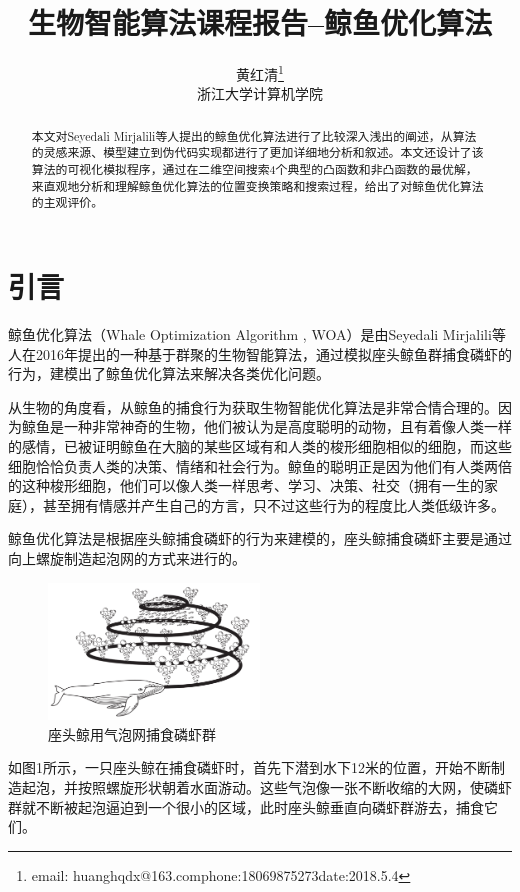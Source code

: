 \documentclass[12pt,a4paper]{article}
\author{黄红清\footnote{email: huanghqdx@163.com\quad phone:18069875273\quad date:2018.5.4}\quad21721214\\[2ex] 浙江大学计算机学院\\[2ex]}
\title{生物智能算法课程报告--鲸鱼优化算法}
\date{}
\begin{document}
\makeatletter
\let\@afterindentfalse\@afterindenttrue
\@afterindenttrue
\makeatother
\setlength{\parindent}{2em}  %
\maketitle

\begin{abstract}
\renewcommand{\abstractname}{摘要}
本文对Seyedali Mirjalili等人提出的鲸鱼优化算法进行了比较深入浅出的阐述，从算法的灵感来源、模型建立到伪代码实现都进行了更加详细地分析和叙述。本文还设计了该算法的可视化模拟程序，通过在二维空间搜索4个典型的凸函数和非凸函数的最优解，来直观地分析和理解鲸鱼优化算法的位置变换策略和搜索过程，给出了对鲸鱼优化算法的主观评价。
\end{abstract}

\section{引言}
鲸鱼优化算法（Whale Optimization Algorithm , WOA）是由Seyedali Mirjalili等人在2016年提出的一种基于群聚的生物智能算法，通过模拟座头鲸鱼群捕食磷虾的行为，建模出了鲸鱼优化算法来解决各类优化问题。

从生物的角度看，从鲸鱼的捕食行为获取生物智能优化算法是非常合情合理的。因为鲸鱼是一种非常神奇的生物，他们被认为是高度聪明的动物，且有着像人类一样的感情，已被证明鲸鱼在大脑的某些区域有和人类的梭形细胞相似的细胞，而这些细胞恰恰负责人类的决策、情绪和社会行为。鲸鱼的聪明正是因为他们有人类两倍的这种梭形细胞，他们可以像人类一样思考、学习、决策、社交（拥有一生的家庭），甚至拥有情感并产生自己的方言，只不过这些行为的程度比人类低级许多。

鲸鱼优化算法是根据座头鲸捕食磷虾的行为来建模的，座头鲸捕食磷虾主要是通过向上螺旋制造起泡网的方式来进行的。
\begin{figure}[H]
\centering
\includegraphics[width=0.5\textwidth]{figure/bubble_net.png}
\renewcommand\figurename{图}\caption{座头鲸用气泡网捕食磷虾群}
\end{figure}
如图1所示，一只座头鲸在捕食磷虾时，首先下潜到水下12米的位置，开始不断制造起泡，并按照螺旋形状朝着水面游动。这些气泡像一张不断收缩的大网，使磷虾群就不断被起泡逼迫到一个很小的区域，此时座头鲸垂直向磷虾群游去，捕食它们。
\end{document}
